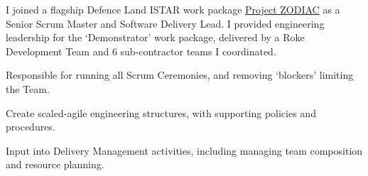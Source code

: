 \sectionsep{}
I joined a flagship Defence Land ISTAR work package \href{https://www.roke.co.uk/news/digitising-land-tactical-istar}{Project ZODIAC} as a Senior Scrum Master and Software Delivery Lead. I provided engineering leadership for the `Demonstrator' work package, delivered by a Roke Development Team and 6 sub-contractor teams I coordinated.
\vspace{0.25em}
\begin{tightemize}
  \item Responsible for running all Scrum Ceremonies, and removing `blockers' limiting the Team.
  \item Create scaled-agile engineering structures, with supporting policies and procedures.
  \item Input into Delivery Management activities, including managing team composition and resource planning.
\end{tightemize}
\sectionsep{}
